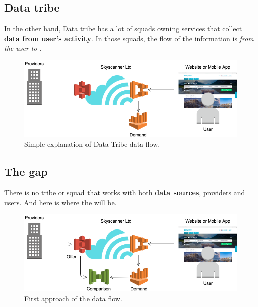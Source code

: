 \subsection{Data tribe} \label{data_tribe}

In the other hand, Data tribe has a lot of squads owning services that collect \textbf{data from user's activity}. In those squads, the flow of the information is \textit{from the user to \company}.

\begin{figure}[H]
\centering
\includegraphics[scale=0.45]{diagrams/state-of-the-art-tribes-data-tribe.png}
\caption{Simple explanation of Data Tribe data flow.}
\end{figure}

\subsection{The gap}

There is no tribe or squad that works with both \textbf{data sources}, providers and users. And here is where the \thesis will be.

\begin{figure}[H]
\centering
\includegraphics[scale=0.45]{diagrams/state-of-the-art-tribes-comparison.png}
\caption{First approach of the \thesis data flow.}
\end{figure}



